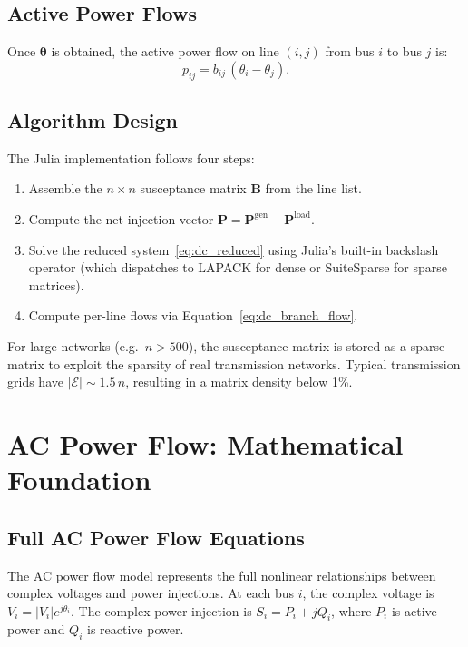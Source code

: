 \subsection{Active Power Flows}

Once $\boldsymbol{\theta}$ is obtained, the active power flow on line $(i,j)$ from bus $i$ to bus $j$ is:
\begin{equation}
    p_{ij} = b_{ij}\,(\theta_i - \theta_j).
    \label{eq:dc_branch_flow}
\end{equation}

\subsection{Algorithm Design}

The Julia implementation follows four steps:
\begin{enumerate}
    \item Assemble the $n \times n$ susceptance matrix $\mathbf{B}$ from the line list.
    \item Compute the net injection vector $\mathbf{P} = \mathbf{P}^\text{gen} - \mathbf{P}^\text{load}$.
    \item Solve the reduced system~\eqref{eq:dc_reduced} using Julia's built-in backslash operator (which dispatches to LAPACK for dense or SuiteSparse for sparse matrices).
    \item Compute per-line flows via Equation~\eqref{eq:dc_branch_flow}.
\end{enumerate}

For large networks (e.g.\ $n > 500$), the susceptance matrix is stored as a sparse matrix to exploit the sparsity of real transmission networks. Typical transmission grids have $|\mathcal{E}| \sim 1.5\,n$, resulting in a matrix density below 1\%.

\section{AC Power Flow: Mathematical Foundation}

\subsection{Full AC Power Flow Equations}

The AC power flow model represents the full nonlinear relationships between complex voltages and power injections. At each bus $i$, the complex voltage is $V_i = |V_i|e^{j\theta_i}$. The complex power injection is $S_i = P_i + jQ_i$, where $P_i$ is active power and $Q_i$ is reactive power.

